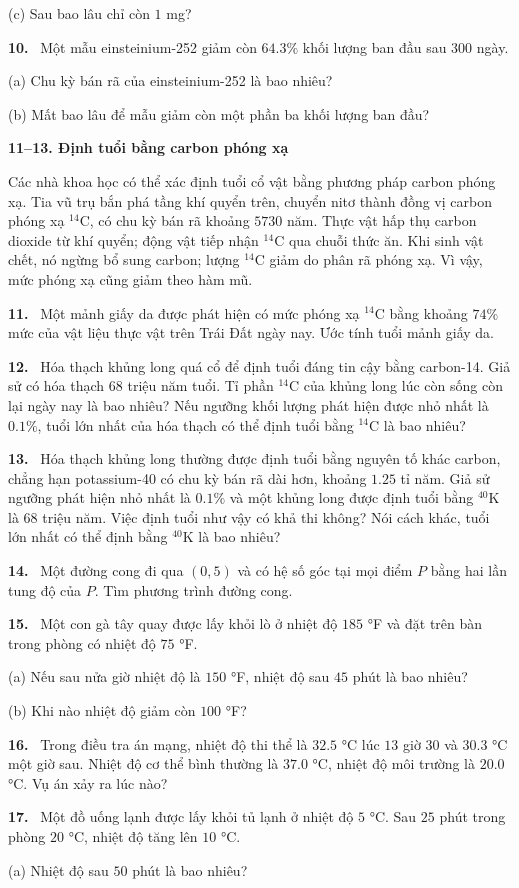 \documentclass[12pt,a4paper]{article}
\newcommand{\bt}[1]{\par\smallskip\noindent\textbf{#1.}\ }
\newcommand{\group}[1]{\par\medskip\noindent\textbf{#1}\par\nopagebreak[4]}
\begin{document}
(c) Sau bao lâu chỉ còn $1$ mg?
\bt{10} Một mẫu einsteinium-252 giảm còn $64.3\%$ khối lượng ban đầu sau $300$ ngày.

(a) Chu kỳ bán rã của einsteinium-252 là bao nhiêu?

(b) Mất bao lâu để mẫu giảm còn một phần ba khối lượng ban đầu?
\group{11–13. Định tuổi bằng carbon phóng xạ} Các nhà khoa học có thể xác định tuổi cổ vật bằng phương pháp carbon phóng xạ. Tia vũ trụ bắn phá tầng khí quyển trên, chuyển nitơ thành đồng vị carbon phóng xạ $^{14}\mathrm C$, có chu kỳ bán rã khoảng $5730$ năm. Thực vật hấp thụ carbon dioxide từ khí quyển; động vật tiếp nhận $^{14}\mathrm C$ qua chuỗi thức ăn. Khi sinh vật chết, nó ngừng bổ sung carbon; lượng $^{14}\mathrm C$ giảm do phân rã phóng xạ. Vì vậy, mức phóng xạ cũng giảm theo hàm mũ.
\bt{11} Một mảnh giấy da được phát hiện có mức phóng xạ $^{14}\mathrm C$ bằng khoảng $74\%$ mức của vật liệu thực vật trên Trái Đất ngày nay. Ước tính tuổi mảnh giấy da.
\bt{12} Hóa thạch khủng long quá cổ để định tuổi đáng tin cậy bằng carbon-14. Giả sử có hóa thạch $68$ triệu năm tuổi. Tỉ phần $^{14}\mathrm C$ của khủng long lúc còn sống còn lại ngày nay là bao nhiêu? Nếu ngưỡng khối lượng phát hiện được nhỏ nhất là $0.1\%$, tuổi lớn nhất của hóa thạch có thể định tuổi bằng $^{14}\mathrm C$ là bao nhiêu?
\bt{13} Hóa thạch khủng long thường được định tuổi bằng nguyên tố khác carbon, chẳng hạn potassium-40 có chu kỳ bán rã dài hơn, khoảng $1.25$ tỉ năm. Giả sử ngưỡng phát hiện nhỏ nhất là $0.1\%$ và một khủng long được định tuổi bằng $^{40}\mathrm K$ là $68$ triệu năm. Việc định tuổi như vậy có khả thi không? Nói cách khác, tuổi lớn nhất có thể định bằng $^{40}\mathrm K$ là bao nhiêu?
\bt{14} Một đường cong đi qua $(0,5)$ và có hệ số góc tại mọi điểm $P$ bằng hai lần tung độ của $P$. Tìm phương trình đường cong.
\bt{15} Một con gà tây quay được lấy khỏi lò ở nhiệt độ $185$ °F và đặt trên bàn trong phòng có nhiệt độ $75$ °F.

(a) Nếu sau nửa giờ nhiệt độ là $150$ °F, nhiệt độ sau $45$ phút là bao nhiêu?

(b) Khi nào nhiệt độ giảm còn $100$ °F?
\bt{16} Trong điều tra án mạng, nhiệt độ thi thể là $32.5$ °C lúc $13$ giờ $30$ và $30.3$ °C một giờ sau. Nhiệt độ cơ thể bình thường là $37.0$ °C, nhiệt độ môi trường là $20.0$ °C. Vụ án xảy ra lúc nào?
\bt{17} Một đồ uống lạnh được lấy khỏi tủ lạnh ở nhiệt độ $5$ °C. Sau $25$ phút trong phòng $20$ °C, nhiệt độ tăng lên $10$ °C.

(a) Nhiệt độ sau $50$ phút là bao nhiêu?
\end{document}
